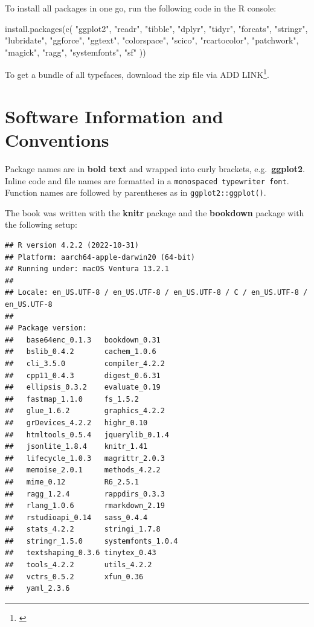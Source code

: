 \documentclass[
]{krantz}
\makeatletter
\newenvironment{Shaded}{\begin{snugshade}}{\end{snugshade}}
\newcommand{\FunctionTok}[1]{\textcolor[rgb]{0,0,0}{#1}}
\newcommand{\NormalTok}[1]{#1}
\newcommand{\StringTok}[1]{\textcolor[rgb]{0.5,0.5,0.5}{#1}}
\renewcommand{\href}[2]{#2\footnote{\url{#1}}}
\newenvironment{kframe}{%
\medskip{}
\setlength{\fboxsep}{.8em}
 \def\at@end@of@kframe{}%
 \ifinner\ifhmode%
  \def\at@end@of@kframe{\end{minipage}}%
  \begin{minipage}{\columnwidth}%
 \fi\fi%
 \def\FrameCommand##1{\hskip\@totalleftmargin \hskip-\fboxsep
 \colorbox{shadecolor}{##1}\hskip-\fboxsep
     \hskip-\linewidth \hskip-\@totalleftmargin \hskip\columnwidth}%
 \MakeFramed {\advance\hsize-\width
   \@totalleftmargin\z@ \linewidth\hsize
   \@setminipage}}%
 {\par\unskip\endMakeFramed%
 \at@end@of@kframe}
\renewenvironment{Shaded}{\begin{kframe}}{\end{kframe}}
\makeatother
\begin{document}
To install all packages in one go, run the following code in the R console:

\begin{Shaded}
\begin{Highlighting}[]
\FunctionTok{install.packages}\NormalTok{(}\FunctionTok{c}\NormalTok{(}
  \StringTok{"ggplot2"}\NormalTok{, }\StringTok{"readr"}\NormalTok{, }\StringTok{"tibble"}\NormalTok{, }\StringTok{"dplyr"}\NormalTok{, }\StringTok{"tidyr"}\NormalTok{, }\StringTok{"forcats"}\NormalTok{, }
  \StringTok{"stringr"}\NormalTok{, }\StringTok{"lubridate"}\NormalTok{, }\StringTok{"ggforce"}\NormalTok{, }\StringTok{"ggtext"}\NormalTok{, }\StringTok{"colorspace"}\NormalTok{, }\StringTok{"scico"}\NormalTok{,}
  \StringTok{"rcartocolor"}\NormalTok{, }\StringTok{"patchwork"}\NormalTok{, }\StringTok{"magick"}\NormalTok{, }\StringTok{"ragg"}\NormalTok{, }\StringTok{"systemfonts"}\NormalTok{, }\StringTok{"sf"}
\NormalTok{))}
\end{Highlighting}
\end{Shaded}

To get a bundle of all typefaces, download the zip file via \href{}{ADD LINK}.

\hypertarget{software-information-and-conventions}{%
\section*{Software Information and Conventions}\label{software-information-and-conventions}}


Package names are in \textbf{bold text} and wrapped into curly brackets, e.g.~\textbf{ggplot2}. Inline code and file names are formatted in a \texttt{monospaced\ typewriter\ font}. Function names are followed by parentheses as in \texttt{ggplot2::ggplot()}.

The book was written with the \textbf{knitr} package \citep{xie2015} and the \textbf{bookdown} package \citep{R-bookdown} with the following setup:

\begin{verbatim}
## R version 4.2.2 (2022-10-31)
## Platform: aarch64-apple-darwin20 (64-bit)
## Running under: macOS Ventura 13.2.1
## 
## Locale: en_US.UTF-8 / en_US.UTF-8 / en_US.UTF-8 / C / en_US.UTF-8 / en_US.UTF-8
## 
## Package version:
##   base64enc_0.1.3   bookdown_0.31    
##   bslib_0.4.2       cachem_1.0.6     
##   cli_3.5.0         compiler_4.2.2   
##   cpp11_0.4.3       digest_0.6.31    
##   ellipsis_0.3.2    evaluate_0.19    
##   fastmap_1.1.0     fs_1.5.2         
##   glue_1.6.2        graphics_4.2.2   
##   grDevices_4.2.2   highr_0.10       
##   htmltools_0.5.4   jquerylib_0.1.4  
##   jsonlite_1.8.4    knitr_1.41       
##   lifecycle_1.0.3   magrittr_2.0.3   
##   memoise_2.0.1     methods_4.2.2    
##   mime_0.12         R6_2.5.1         
##   ragg_1.2.4        rappdirs_0.3.3   
##   rlang_1.0.6       rmarkdown_2.19   
##   rstudioapi_0.14   sass_0.4.4       
##   stats_4.2.2       stringi_1.7.8    
##   stringr_1.5.0     systemfonts_1.0.4
##   textshaping_0.3.6 tinytex_0.43     
##   tools_4.2.2       utils_4.2.2      
##   vctrs_0.5.2       xfun_0.36        
##   yaml_2.3.6
\end{verbatim}
\end{document}
